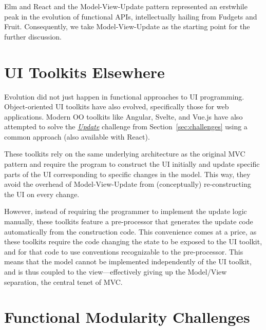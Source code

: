 \documentclass[sigplan,screen]{acmart}
\begin{document}

Elm and React and the Model-View-Update pattern represented an
erstwhile peak in the evolution of functional APIs, intellectually
hailing from Fudgets and Fruit.  Consequently, we take
Model-View-Update as the starting point for the further discussion.

\section{UI Toolkits Elsewhere}
\label{sec:ui-toolkits-elsewhere}

Evolution did not just happen in functional approaches to UI
programming.  Object-oriented UI toolkits have also evolved,
specifically those for web applications.  Modern OO toolkits like
Angular, Svelte, and Vue.js have also attempted to solve the \hyperlink{challenge:update}{\textit{Update}} challenge
from Section~\ref{sec:challenges} using a common approach (also
available with React).

These toolkits rely on the same underlying architecture as the
original MVC pattern and require the program to construct the UI
initially and update specific parts of the UI corresponding to
specific changes in the model.  This way, they avoid the overhead of
Model-View-Update from (conceptually) re-constructing the UI on every
change.

However, instead of requiring the programmer to implement the update
logic manually, these toolkits feature a pre-processor 
that generates the update code automatically from the construction code.
This convenience comes at a price, as these toolkits require
the code changing the state to be exposed to the UI toolkit, and for
that code to use conventions recognizable to the pre-processor.  This
means that the model cannot be implemented independently of the UI
toolkit, and is thus coupled to the view---effectively giving up the
Model/View separation, the central tenet of MVC.

\section{Functional Modularity Challenges}
\label{sec:modularity-challenges}
\end{document}
